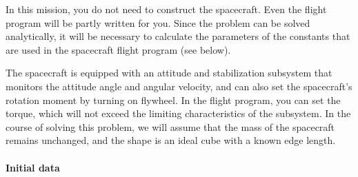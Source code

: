 \documentclass[12pt,a4paper]{article}
\begin{document}
In this mission, you do not need to construct the spacecraft. Even the flight program will be partly written for you. Since the problem can be solved analytically, it will be necessary to calculate the parameters of the constants that are used in the spacecraft flight program (see below).

The spacecraft is equipped with an attitude and stabilization subsystem that monitors the attitude angle and angular velocity, and can also set the spacecraft’s rotation moment by turning on
flywheel. In the flight program, you can set the torque, which will not exceed the limiting characteristics of the subsystem. In the course of solving this problem, we will assume that the mass of the spacecraft remains unchanged, and the shape is an ideal cube with a known edge length.

\paragraph{Initial data}
\end{document}
